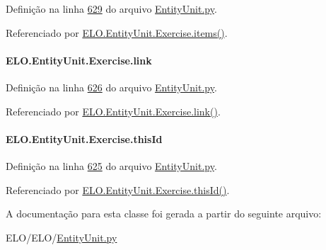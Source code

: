 Definição na linha \hyperlink{EntityUnit_8py_source_l00629}{629} do arquivo \hyperlink{EntityUnit_8py_source}{Entity\-Unit.\-py}.



Referenciado por \hyperlink{classELO_1_1EntityUnit_1_1Exercise_a7e95e4287551ac552687fa5d0acb6305}{E\-L\-O.\-Entity\-Unit.\-Exercise.\-items()}.

\hypertarget{classELO_1_1EntityUnit_1_1Exercise_a13a9382d9126f07ab380ea11df276ed8}{
\paragraph[{link}]{\setlength{\rightskip}{0pt plus 5cm}E\-L\-O.\-Entity\-Unit.\-Exercise.\-link}}\label{classELO_1_1EntityUnit_1_1Exercise_a13a9382d9126f07ab380ea11df276ed8}


Definição na linha \hyperlink{EntityUnit_8py_source_l00626}{626} do arquivo \hyperlink{EntityUnit_8py_source}{Entity\-Unit.\-py}.



Referenciado por \hyperlink{classELO_1_1EntityUnit_1_1Exercise_a9a140c7c2c9e4b90d1f40acfed62efd0}{E\-L\-O.\-Entity\-Unit.\-Exercise.\-link()}.

\hypertarget{classELO_1_1EntityUnit_1_1Exercise_a6277daccaa7fe96d8f0a287002cea07a}{
\paragraph[{this\-Id}]{\setlength{\rightskip}{0pt plus 5cm}E\-L\-O.\-Entity\-Unit.\-Exercise.\-this\-Id}}\label{classELO_1_1EntityUnit_1_1Exercise_a6277daccaa7fe96d8f0a287002cea07a}


Definição na linha \hyperlink{EntityUnit_8py_source_l00625}{625} do arquivo \hyperlink{EntityUnit_8py_source}{Entity\-Unit.\-py}.



Referenciado por \hyperlink{classELO_1_1EntityUnit_1_1Exercise_a16ee1a43f22c4d9f99f2a98fa02c016b}{E\-L\-O.\-Entity\-Unit.\-Exercise.\-this\-Id()}.



A documentação para esta classe foi gerada a partir do seguinte arquivo\-:\begin{DoxyCompactItemize}
\item 
E\-L\-O/\-E\-L\-O/\hyperlink{EntityUnit_8py}{Entity\-Unit.\-py}\end{DoxyCompactItemize}
